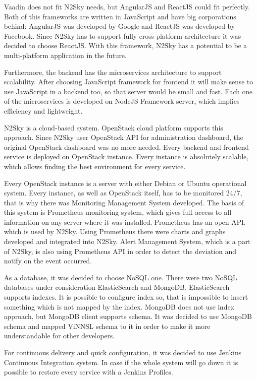  Vaadin does not fit N2Sky needs, but AngularJS and ReactJS could fit perfectly. Both of this frameworks are written in JavaScript and have big corporations behind: AngularJS was developed by Google and ReactJS was developed by Facebook. Since N2Sky has to support fully cross-platform architecture it was decided to choose ReactJS. With this framework, N2Sky has a potential to be a multi-platform application in the future. 
 

Furthermore, the backend has the microservices architecture to support scalability. After choosing JavaScript framework for frontend it will make sense to use JavaScript in a backend too, so that server would be small and fast. Each one of the microservices is developed on NodeJS Framework server, which implies efficiency and lightweight. 

N2Sky is a cloud-based system. OpenStack cloud platform supports this approach. Since N2Sky user OpenStack API for administration dashboard, the original OpenStack dashboard was no more needed. Every backend and frontend service is deployed on OpenStack instance. Every instance is absolutely scalable, which allows finding the best environment for every service. 

Every OpenStack instance is a server with either Debian or Ubuntu operational system. Every instance, as well as OpenStack itself, has to be monitored 24/7, that is why there was Monitoring Management System developed. The basis of this system is Prometheus monitoring system, which gives full access to all information on any server where it was installed. Prometheus has an open API, which is used by N2Sky. Using Prometheus there were charts and graphs developed and integrated into N2Sky. Alert Management System, which is a part of N2Sky, is also using  Prometheus API in order to detect the deviation and notify on the event occurred.

As a database, it was decided to choose NoSQL one. There were two NoSQL databases under consideration ElasticSearch and MongoDB. 
ElasticSearch supports indexes. It is possible to configure index so, that is impossible to insert something which is not mapped by the index.  MongoDB does not use index approach, but MongoDB client supports schema. It was decided to use MongoDB schema and mapped ViNNSL schema to it in order to make it more understandable for other developers. 

For continuous delivery and quick configuration, it was decided to use Jenkins Continuous Integration system. In case if the whole system will go down it is possible to restore every service with a Jenkins Profiles.


